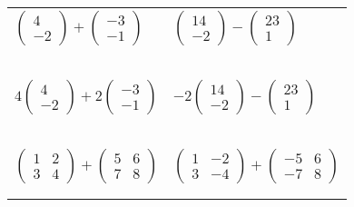 \documentclass[fontsize=20pt]{scrartcl}
\begin{document}
\begin{tabular}{p{13cm}p{13cm}}
$\begin{pmatrix}4\\-2 \end{pmatrix} + \begin{pmatrix}-3\\-1 \end{pmatrix}$
&$\begin{pmatrix}14\\-2 \end{pmatrix} - \begin{pmatrix}23\\1 \end{pmatrix}$
\\\\\\
\\\\\\

$4\begin{pmatrix}4\\-2 \end{pmatrix} + 2\begin{pmatrix}-3\\-1 \end{pmatrix}$
&$-2\begin{pmatrix}14\\-2 \end{pmatrix} - \begin{pmatrix}23\\1 \end{pmatrix}$
\\\\\\
\\\\\\

$\begin{pmatrix}1&2\\3&4 \end{pmatrix}+\begin{pmatrix}5&6\\7&8 \end{pmatrix}$
&$\begin{pmatrix}1&-2\\3&-4 \end{pmatrix}+\begin{pmatrix}-5&6\\-7&8 \end{pmatrix}$
\\\\\\
\end{tabular}
\end{document}
